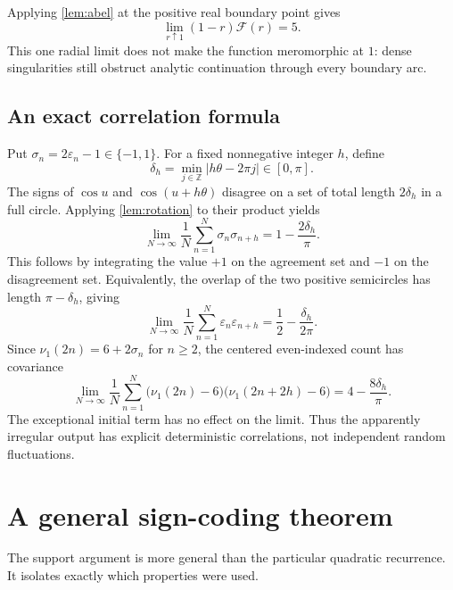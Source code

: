 \documentclass[11pt]{article}
\theoremstyle{definition}\newtheorem{definition}[theorem]{Definition}
\theoremstyle{remark}\newtheorem{remark}[theorem]{Remark}
\newcommand{\Z}{\mathbb Z}\newcommand{\Q}{\mathbb Q}\newcommand{\C}{\mathbb C}
\newcommand{\eps}{\varepsilon}
\newcommand{\nuone}{\nu_1}
\newcommand{\F}{\mathcal F}
\begin{document}
Applying \cref{lem:abel} at the positive real boundary point gives
\begin{equation}\label{eq:realradial}
 \lim_{r\uparrow1}(1-r)\F(r)=5.
\end{equation}
This one radial limit does not make the function meromorphic at $1$: dense singularities still obstruct analytic continuation through every boundary arc.

\subsection{An exact correlation formula}

Put $\sigma_n=2\eps_n-1\in\{-1,1\}$. For a fixed nonnegative integer $h$, define
\[
 \delta_h=\min_{j\in\Z}|h\theta-2\pi j|\in[0,\pi].
\]
The signs of $\cos u$ and $\cos(u+h\theta)$ disagree on a set of total length $2\delta_h$ in a full circle. Applying \cref{lem:rotation} to their product yields
\begin{equation}\label{eq:correlation}
 \lim_{N\to\infty}\frac1N\sum_{n=1}^N\sigma_n\sigma_{n+h}
 =1-\frac{2\delta_h}{\pi}.
\end{equation}
This follows by integrating the value $+1$ on the agreement set and $-1$ on the disagreement set. Equivalently, the overlap of the two positive semicircles has length $\pi-\delta_h$, giving
\[
 \lim_{N\to\infty}\frac1N\sum_{n=1}^N\eps_n\eps_{n+h}
 =\frac12-\frac{\delta_h}{2\pi}.
\]
Since $\nuone(2n)=6+2\sigma_n$ for $n\geq2$, the centered even-indexed count has covariance
\begin{equation}\label{eq:evencorrelation}
 \lim_{N\to\infty}\frac1N\sum_{n=1}^N
  \bigl(\nuone(2n)-6\bigr)\bigl(\nuone(2n+2h)-6\bigr)
 =4-\frac{8\delta_h}{\pi}.
\end{equation}
The exceptional initial term has no effect on the limit. Thus the apparently irregular output has explicit deterministic correlations, not independent random fluctuations.

\section{A general sign-coding theorem}

The support argument is more general than the particular quadratic recurrence. It isolates exactly which properties were used.
\end{document}
